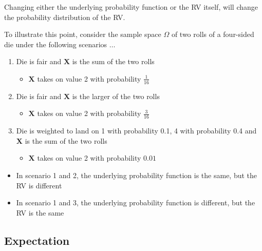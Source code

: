 \documentclass{article}
\begin{document}
Changing either the underlying probability function or the RV itself, will change the probability distribution of the RV.

To illustrate this point, consider the sample space $\Omega$ of two rolls of a four-sided die under the following scenarios $\dots$
\begin{enumerate}
    \item Die is fair and $\boldsymbol{X}$ is the sum of the two rolls
        \begin{itemize}
            \item $\boldsymbol{X}$ takes on value 2 with probability $\frac{1}{16}$
        \end{itemize}
    \item Die is fair and $\boldsymbol{X}$ is the larger of the two rolls
        \begin{itemize}
            \item $\boldsymbol{X}$ takes on value 2 with probability $\frac{3}{16}$
        \end{itemize}
    \item Die is weighted to land on 1 with probability 0.1, 4 with probability 0.4 and $\boldsymbol{X}$ is the sum of the two rolls
        \begin{itemize}
            \item $\boldsymbol{X}$ takes on value 2 with probability $0.01$
        \end{itemize}
\end{enumerate}

\begin{itemize}
    \item In scenario 1 and 2, the underlying probability function is the same, but the RV is different
    \item In scenario 1 and 3, the underlying probability function is different, but the RV is the same
\end{itemize}

\subsection{Expectation}
\end{document}
